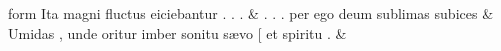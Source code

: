 \documentclass[12pt,onecolumn,twoside,a4paper]{memoir}
\begin{document}
               \begin{pairs}
                  \begin{Leftside}
			\beginnumbering
			\setcounter{stanzaL}{0}
                     
                         \stanza 
                     form
                              Ita
                              magni
                              fluctus
                              eiciebantur
                              .
                              .
                              . \&
                         \stanza .
                              .
                              .
                              per
                              ego
                              deum
                              sublimas
                              subices &
                     Umidas
                              ,
                              unde
                              oritur
                              imber
                              sonitu
                              sævo
                              [
                              et
                              spiritu
                              . \&
                         \stanza 
                     

\end{Leftside}
\end{pairs}
\end{document}
